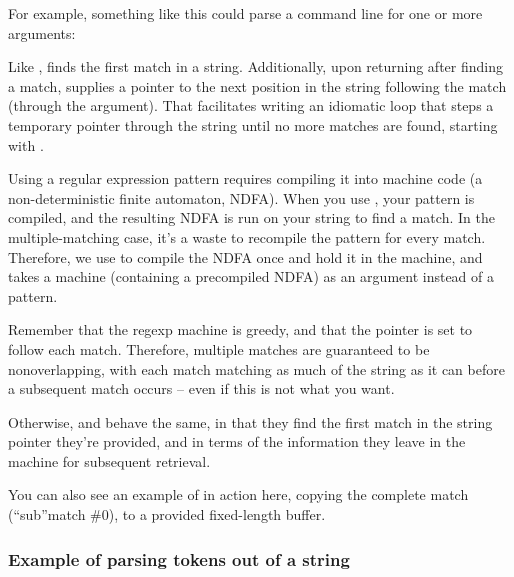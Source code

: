 For example, something like this could parse a command line for one or
more arguments:


Like ,
 finds the first match in a
string. Additionally, upon returning after finding a match,
 supplies a pointer to the next
position in the string following the match (through the 
argument). That facilitates writing an idiomatic  loop
that steps a temporary pointer  through the string until no
more matches are found, starting with .

Using a regular expression pattern requires compiling it into machine
code (a non-deterministic finite automaton, NDFA). When you use
, your pattern is compiled, and the
resulting NDFA is run on your string to find a match. In the
multiple-matching case, it's a waste to recompile the pattern for
every match. Therefore, we use  to
compile the NDFA once and hold it in the machine, and
 takes a machine (containing a
precompiled NDFA) as an argument instead of a pattern.

Remember that the regexp machine is greedy, and that the pointer is set
to follow each match. Therefore, multiple matches are guaranteed to be
nonoverlapping, with each match matching as much of the string as it
can before a subsequent match occurs -- even if this is not what you
want.

Otherwise,  and
 behave the same, in that they find the
first match in the string pointer they're provided, and in terms of
the information they leave in the machine for subsequent retrieval.

You can also see an example of  in
action here, copying the complete match (``sub''match \#0), to a
provided fixed-length buffer.

\subsubsection{Example of parsing tokens out of a string}

